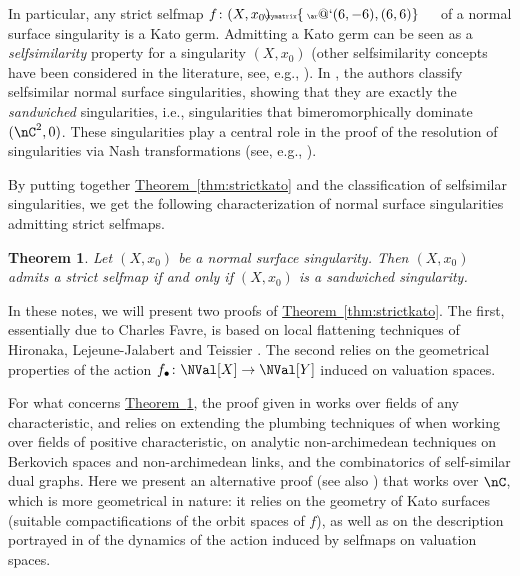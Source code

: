 \documentclass[11 pt, twoside, a4paper]{amsart}
\makeatletter
\newcommand{\selfarrow}[1][]{\tiny{\!\!\!\xymatrix{\phantom{|}\ar@`{(6,-6),(6,6)}}\hspace{4mm}}}
\newtheorem{introthm}{Theorem}
\theoremstyle{definition}
\theoremstyle{definition}
\newcommand{\refthm}[1]{\hyperref[thm:#1]{Theorem~\ref*{thm:#1}}}
\makeatother
\begin{document}
In particular, any strict selfmap $f \colon (X,x_0) \selfarrow$ of a normal surface singularity is a Kato germ.
Admitting a Kato germ can be seen as a \emph{selfsimilarity} property for a singularity $(X,x_0)$ (other selfsimilarity concepts have been considered in the literature, see, e.g., \cite{defelipe:topspacesval}).
In \cite{fantini-favre-ruggiero:sandwichselfsim}, the authors classify selfsimilar normal surface singularities, showing that they are exactly the \emph{sandwiched} singularities, i.e., singularities that bimeromorphically dominate $(\nC^2,0)$. These singularities play a central role in the proof of the resolution of singularities via Nash transformations (see, e.g., \cite{spivakovsky:sandwichedsing}).

By putting together \refthm{strictkato} and the classification of selfsimilar singularities, we get the following characterization of normal surface singularities admitting strict selfmaps.
 
\begin{introthm}\label{thm:strictsandwiched}
Let $(X,x_0)$ be a normal surface singularity. Then $(X,x_0)$ admits a strict selfmap if and only if $(X,x_0)$ is a sandwiched singularity.
\end{introthm}

\medskip

In these notes, we will present two proofs of \refthm{strictkato}.
The first, essentially due to Charles Favre, 
is based on local flattening techniques of Hironaka, Lejeune-Jalabert and Teissier \cite{hironaka:introrealanal,hironaka:flattening,hironaka-lejeunejalabert-teissier:platificateurlocal}.
The second 
relies on the geometrical properties of the action $f_\bullet \colon \NVal[X] \to \NVal[Y]$ induced on valuation spaces.

For what concerns \refthm{strictsandwiched}, the proof given in \cite{fantini-favre-ruggiero:sandwichselfsim} works over fields of any characteristic, and relies on extending the plumbing techniques of \cite{spivakovsky:sandwichedsing} when working over fields of positive characteristic, on analytic non-archimedean techniques on Berkovich spaces and non-archimedean links, and the combinatorics of self-similar dual graphs.
Here we present an alternative proof (see also \cite[Section 3.4]{ruggiero:HDR}) that works over $\nC$, which is more geometrical in nature: it relies on the geometry of Kato surfaces (suitable compactifications of the orbit spaces of $f$), as well as on the description portrayed in \cite{gignac-ruggiero:locdynnoninvnormsurfsing} of the dynamics of the action induced by selfmaps on valuation spaces.
\end{document}

